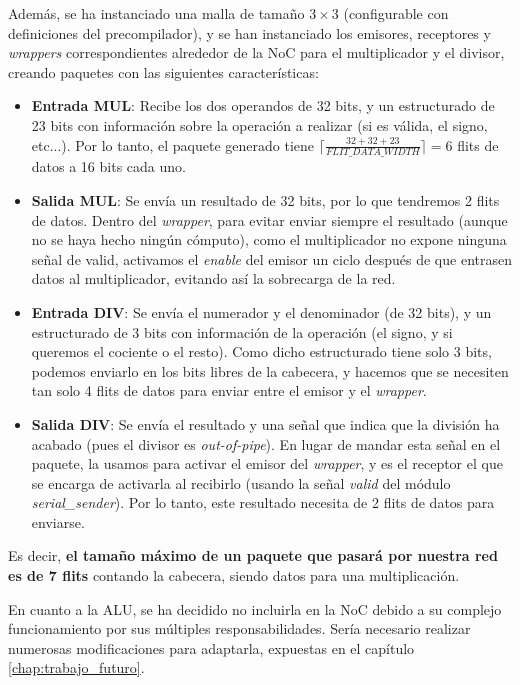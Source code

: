 Además, se ha instanciado una malla de tamaño $3\times 3$ (configurable con definiciones del precompilador), y se han instanciado los emisores, receptores y \textit{wrappers} correspondientes alrededor de la NoC para el multiplicador y el divisor, creando paquetes con las siguientes características:

\begin{itemize}
    \item \textbf{Entrada MUL}: Recibe los dos operandos de 32 bits, y un estructurado de 23 bits con información sobre la operación a realizar (si es válida, el signo, etc...). Por lo tanto, el paquete generado tiene $\lceil\frac{32+32+23}{FLIT\_DATA\_WIDTH}\rceil = 6$ flits de datos a 16 bits cada uno.
    \item \textbf{Salida MUL}: Se envía un resultado de 32 bits, por lo que tendremos 2 flits de datos. Dentro del \textit{wrapper}, para evitar enviar siempre el resultado (aunque no se haya hecho ningún cómputo), como el multiplicador no expone ninguna señal de valid, activamos el \textit{enable} del emisor un ciclo después de que entrasen datos al multiplicador, evitando así la sobrecarga de la red.
    \item \textbf{Entrada DIV}: Se envía el numerador y el denominador (de 32 bits), y un estructurado de 3 bits con información de la operación (el signo, y si queremos el cociente o el resto). Como dicho estructurado tiene solo 3 bits, podemos enviarlo en los bits libres de la cabecera, y hacemos que se necesiten tan solo 4 flits de datos para enviar entre el emisor y el \textit{wrapper}.
    \item \textbf{Salida DIV}: Se envía el resultado y una señal que indica que la división ha acabado (pues el divisor es \textit{out-of-pipe}). En lugar de mandar esta señal en el paquete, la usamos para activar el emisor del \textit{wrapper}, y es el receptor el que se encarga de activarla al recibirlo (usando la señal \textit{valid} del módulo \textit{serial\_sender}). Por lo tanto, este resultado necesita de 2 flits de datos para enviarse.
\end{itemize}

Es decir, \textbf{el tamaño máximo de un paquete que pasará por nuestra red es de 7 flits} contando la cabecera, siendo datos para una multiplicación.

En cuanto a la ALU, se ha decidido no incluirla en la NoC debido a su complejo funcionamiento por sus múltiples responsabilidades. Sería necesario realizar numerosas modificaciones para adaptarla, expuestas en el capítulo \ref{chap:trabajo_futuro}.

